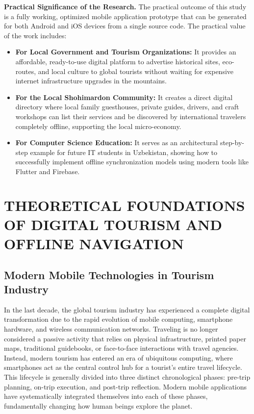 \documentclass[12pt,a4paper,oneside]{report}
\begin{document}
\noindent\textbf{Practical Significance of the Research.} The practical outcome of this
study is a fully working, optimized mobile application prototype that can be generated
for both Android and iOS devices from a single source code. The practical value of the
work includes:
\begin{itemize}[leftmargin=1.4em]
  \item \textbf{For Local Government and Tourism Organizations:} It provides an
        affordable, ready-to-use digital platform to advertise historical sites,
        eco-routes, and local culture to global tourists without waiting for expensive
        internet infrastructure upgrades in the mountains.
  \item \textbf{For the Local Shohimardon Community:} It creates a direct digital
        directory where local family guesthouses, private guides, drivers, and craft
        workshops can list their services and be discovered by international travelers
        completely offline, supporting the local micro-economy.
  \item \textbf{For Computer Science Education:} It serves as an architectural
        step-by-step example for future IT students in Uzbekistan, showing how to
        successfully implement offline synchronization models using modern tools like
        Flutter and Firebase.
\end{itemize}

\chapter{THEORETICAL FOUNDATIONS OF DIGITAL TOURISM AND OFFLINE NAVIGATION}

\section{Modern Mobile Technologies in Tourism Industry}

In the last decade, the global tourism industry has experienced a complete digital
transformation due to the rapid evolution of mobile computing, smartphone hardware, and
wireless communication networks. Traveling is no longer considered a passive activity
that relies on physical infrastructure, printed paper maps, traditional guidebooks, or
face-to-face interactions with travel agencies. Instead, modern tourism has entered an
era of ubiquitous computing, where smartphones act as the central control hub for a
tourist's entire travel lifecycle. This lifecycle is generally divided into three
distinct chronological phases: pre-trip planning, on-trip execution, and post-trip
reflection. Modern mobile applications have systematically integrated themselves into
each of these phases, fundamentally changing how human beings explore the planet.
\end{document}
